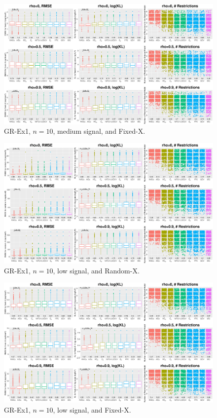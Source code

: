 \begin{figure}[!ht]
\centering
\includegraphics[width=\textwidth]{figures/supplement/fixedx_GR-Ex1_n10_msnr.eps}
\caption{GR-Ex1, $n=10$, medium signal, and Fixed-X.}
\end{figure}
\clearpage
\begin{figure}[!ht]
\centering
\includegraphics[width=\textwidth]{figures/supplement/randomx_GR-Ex1_n10_lsnr.eps}
\caption{GR-Ex1, $n=10$, low signal, and Random-X.}
\end{figure}
\begin{figure}[!ht]
\centering
\includegraphics[width=\textwidth]{figures/supplement/fixedx_GR-Ex1_n10_lsnr.eps}
\caption{GR-Ex1, $n=10$, low signal, and Fixed-X.}
\end{figure}

